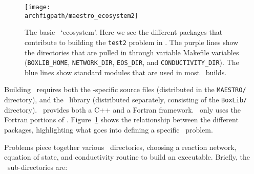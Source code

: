 \begin{figure}[]
\centering
\texttt{[image: \\archfigpath/maestro\_ecosystem2]}
\caption[\maestro\ `ecosystem'] {\label{fig:arch:eco} The basic
  \maestro\ `ecosystem'.  Here we see the different packages that
  contribute to building the {\tt test2} problem in \maestro.  The
  purple lines show the directories that are pulled in through
  variable Makefile variables ({\tt BOXLIB\_HOME}, {\tt NETWORK\_DIR},
  {\tt EOS\_DIR}, and {\tt CONDUCTIVITY\_DIR}).  The blue lines show
  standard modules that are used in most \maestro\ builds.}
\end{figure}


Building \maestro\ requires both the \maestro-specific source
files (distributed in the {\tt MAESTRO/} directory), and the
\boxlib\ library (distributed separately, consisting of the {\tt BoxLib/} directory).
\boxlib\ provides both a C++ and a Fortran framework.  \maestro\
only uses the Fortran portions of \boxlib.  Figure~\ref{fig:arch:eco}
shows the relationship between the different packages, highlighting
what goes into defining a specific \maestro\ problem.

Problems piece together various \maestro\ directories, choosing a
reaction network, equation of state, and conductivity routine to build
an executable.  Briefly, the \maestro\ sub-directories are:

